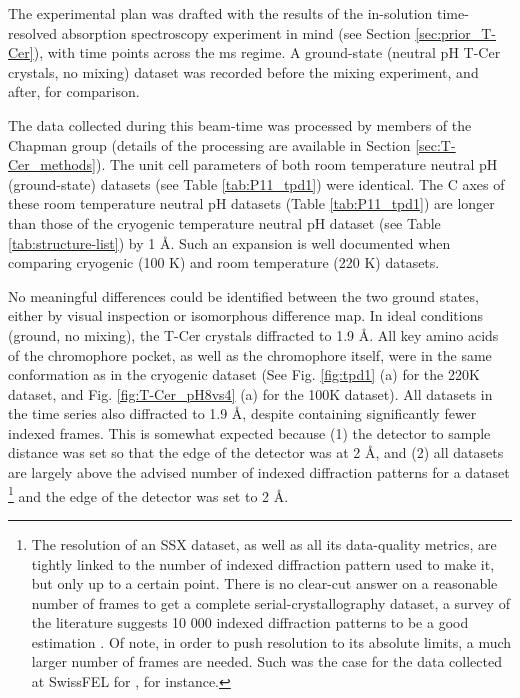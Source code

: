 The experimental plan was drafted with the results of the in-solution time-resolved absorption spectroscopy experiment in mind (see Section \ref{sec:prior_T-Cer}), with time points across the ms regime. A ground-state (neutral pH T-Cer crystals, no mixing) dataset was recorded before the mixing experiment, and after, for comparison.

The data collected during this beam-time was processed by members of the Chapman group (details of the processing are available in Section \ref{sec:T-Cer_methods}). The unit cell parameters of both room temperature neutral pH (ground-state) datasets (see Table \ref{tab:P11_tpd1}) were identical. The C axes of these room temperature neutral pH datasets (Table \ref{tab:P11_tpd1}) are longer than those of the cryogenic temperature neutral pH dataset (see Table \ref{tab:structure-list}) by 1 \AA. Such an expansion is well documented when comparing cryogenic (100 K) and room temperature (220 K) datasets. 

No meaningful differences could be identified between the two ground states, either by visual inspection or isomorphous difference map. In ideal conditions (ground, no mixing), the T-Cer crystals diffracted to 1.9 \AA. All key amino acids of the chromophore pocket, as well as the chromophore itself, were in the same conformation as in the cryogenic dataset (See Fig. \ref{fig:tpd1} (a) for the 220K dataset, and Fig. \ref{fig:T-Cer_pH8vs4}  (a) for the 100K dataset).  All datasets in the time series also diffracted to 1.9 \AA, despite containing significantly fewer indexed frames. This is somewhat expected because (1) the detector to sample distance was set so that the edge of the detector was at 2 \AA, and (2) all datasets are largely above the advised number of indexed diffraction patterns for a dataset \footnote{The resolution of an SSX dataset, as well as all its data-quality metrics, are tightly linked to the number of indexed diffraction pattern used to make it, but only up to a certain point. There is no clear-cut answer on a reasonable number of frames to get a complete serial-crystallography dataset, a survey of the literature suggests 10 000 indexed diffraction patterns to be a good estimation \parencite{pearsonSerialSynchrotronCrystallography2020, zielinskiRapidEfficientRoomtemperature2022}. Of note, in order to push resolution to its absolute limits, a much larger number of frames are needed. Such was the case for the data collected at SwissFEL for \cite{maestre-reynaVisualizingDNARepair2023a}, for instance.} and the edge of the detector was set to 2 \AA.

